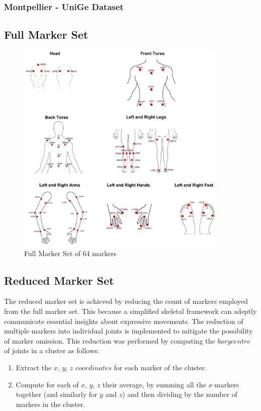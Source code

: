 \subsubsection{Montpellier - UniGe Dataset}

\subsection{Full Marker Set}

\begin{figure}[H]
    \centering
    \includegraphics[width=0.9\textwidth]{graphics/full_marker_set.png}
    \caption{Full Marker Set of 64 markers}
    \label{fig:full_marker_set}
\end{figure}


\subsection{Reduced Marker Set}
The reduced marker set is achieved by reducing the count of markers employed from the full marker set.
This because a simplified skeletal framework can adeptly communicate essential insights about expressive movements.
The reduction of multiple markers into individual joints is implemented to mitigate the possibility of marker omission.
This reduction was performed by computing the $barycentre$ of joints in a cluster as follows:
\begin{enumerate}
    \item Extract the $x$, $y$, $z$ $coordinates$ for each marker of the cluster.
    \item Compute for each of $x$, $y$, $z$ their average, by summing all the $x$-markers together
    (and similarly for $y$ and $z$) and then dividing by the number of markers in the cluster.
\end{enumerate}    

